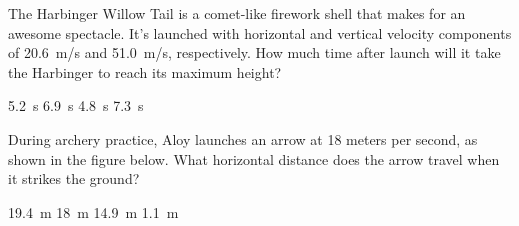 \documentclass[dvipsnames]{exam}
\begin{document}
\begin{questions}
\question
The Harbinger Willow Tail is a comet-like firework shell that makes for an awesome spectacle. It's launched with horizontal and vertical velocity components of \SI{20.6}{m/s} and \SI{51.0}{m/s}, respectively. How much time after launch will it take the Harbinger to reach its maximum height?

\begin{randomizechoices}
    \correctchoice \SI{5.2}{s}
    \choice \SI{6.9}{s}
    \choice \SI{4.8}{s}
    \choice \SI{7.3}{s}
\end{randomizechoices}

\question
During archery practice, Aloy launches an arrow at 18 meters per second, as shown in the figure below. What horizontal distance does the arrow travel when it strikes the ground?  

\vspace{1em}

\begin{minipage}{6cm}
    \centering
    \begin{randomizechoices}
        \correctchoice \SI{19.4}{m}
        \choice \SI{18}{m}
        \choice \SI{14.9}{m}
        \choice \SI{1.1}{m}
    \end{randomizechoices}
\end{minipage}%
\begin{minipage}{6cm}
    \centering
    \begin{center}
    \end{center}
\end{minipage}


\end{questions}
\end{document}
